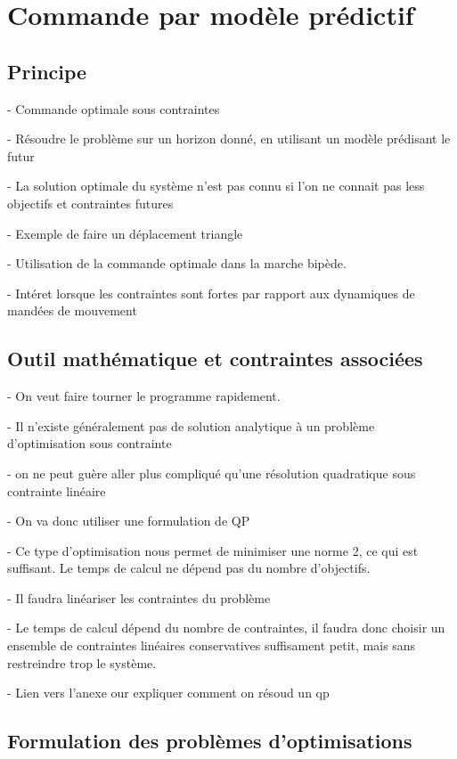 \chapter{Commande par modèle prédictif}
	\section{Principe}

		- Commande optimale sous contraintes

		- Résoudre le problème sur un horizon donné, en utilisant un modèle prédisant le futur

		- La solution optimale du système n'est pas connu si l'on ne connait pas less objectifs et contraintes futures

		- Exemple de faire un déplacement triangle

		- Utilisation de la commande optimale dans la marche bipède.

		- Intéret lorsque les contraintes sont fortes par rapport aux dynamiques de mandées de mouvement

	\section{Outil mathématique et contraintes associées}

			- On veut faire tourner le programme rapidement.

			- Il n'existe généralement pas de solution analytique à un problème d'optimisation sous contrainte

			- on ne peut guère aller plus compliqué qu'une résolution quadratique sous contrainte linéaire

			- On va donc utiliser une formulation de QP

			- Ce type d'optimisation nous permet de minimiser une norme 2, ce qui est suffisant. Le temps de calcul ne dépend pas du nombre d'objectifs.

			- Il faudra linéariser les contraintes du problème

			- Le temps de calcul dépend du nombre de contraintes, il faudra donc choisir un ensemble de contraintes linéaires conservatives suffisament petit, mais sans restreindre trop le système.

			- Lien vers l'anexe our expliquer comment on résoud un qp

	\section{Formulation des problèmes d'optimisations}

